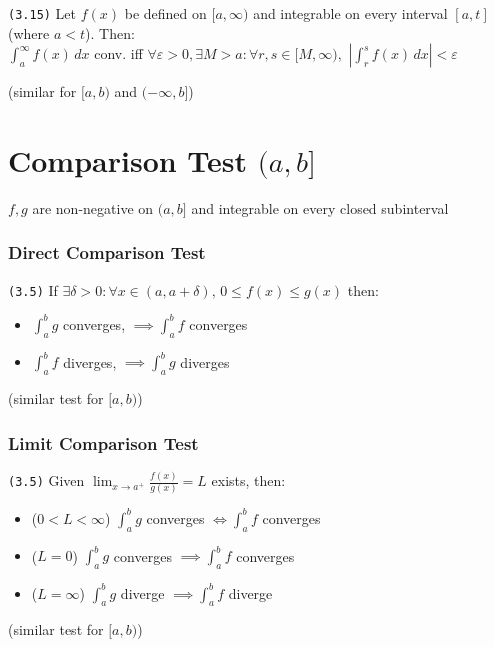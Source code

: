 \documentclass[a4paper,landscape]{article}
\newcommand{\tnum}[1]{{\color{gray}\footnotesize\texttt{(#1)}}}
\begin{document}
\begin{multicols}{2}
\tnum{3.15} Let $f(x)$ be defined on $[a,\infty)$ and integrable on every interval $[a,t]$ (where $a<t$). Then: \\
 $\displaystyle\int ^\infty_{a}f(x) \, dx$ conv. iff $\forall\varepsilon>0,\exists M>a:\forall r,s\in[M,\infty),\,\,\displaystyle\left|\int ^s_{r}f(x) \, dx\right|<\varepsilon$

{\small(similar for $[a,b)$ and $(-\infty,b]$)}

\columnbreak

\section{Comparison Test $(a,b]$}
$f,g$ are non-negative on $(a,b]$ and integrable on every closed subinterval

\subsubsection{Direct Comparison Test}

\tnum{3.5} If $\exists \delta>0:\forall x\in(a,a+\delta),\,0\leq f(x)\leq g(x)$ then:

\begin{itemize}
    \item $\int ^b_{a} g$ converges, $\implies\int ^b_{a} f$ converges
    \item $\int ^b_{a} f$ diverges, $\implies\int ^b_{a} g$ diverges
\end{itemize}

{\small(similar test for $[a,b)$)}

\subsubsection{Limit Comparison Test}

\tnum{3.5\*} Given $\displaystyle\lim_{ x \to a^+ }\frac{f(x)}{g(x)}=L$ exists, then:

\begin{itemize}
    \item ($0<L<\infty$) $\displaystyle\int ^b_{a}g$ converges  $\iff\displaystyle\int ^b_{a}f$ converges
    \item ($L=0$) $\displaystyle\int ^b_{a}g$ converges $\implies\displaystyle\int ^b_{a}f$ converges
    \item ($L=\infty$) $\displaystyle\int ^b_{a}g$ diverge $\implies\displaystyle\int ^b_{a}f$ diverge
\end{itemize}
{\small
(similar test for $[a,b)$)}


\end{multicols}
\end{document}
